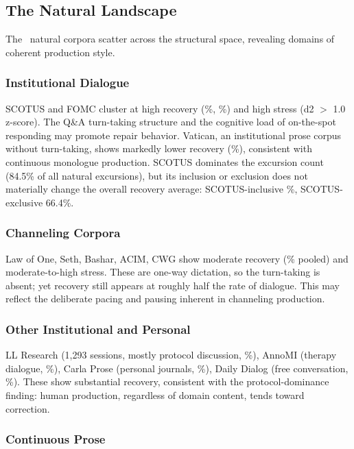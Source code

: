 \documentclass[11pt]{article}
\begin{document}
\subsection{The Natural Landscape}

The \nNatural\ natural corpora scatter across the structural space, revealing domains of coherent production style.

\subsubsection{Institutional Dialogue}

SCOTUS and FOMC cluster at high recovery (\recSCOTUS\%, \recFOMC\%) and high stress (d2 $>$ 1.0 z-score). The Q\&A turn-taking structure and the cognitive load of on-the-spot responding may promote repair behavior. Vatican, an institutional prose corpus without turn-taking, shows markedly lower recovery (\recVatican\%), consistent with continuous monologue production. SCOTUS dominates the excursion count (84.5\% of all natural excursions), but its inclusion or exclusion does not materially change the overall recovery average: SCOTUS-inclusive \recNatCorpusAvg\%, SCOTUS-exclusive 66.4\%.

\subsubsection{Channeling Corpora}

Law of One, Seth, Bashar, ACIM, CWG show moderate recovery (\recChannelingMean\% pooled) and moderate-to-high stress. These are one-way dictation, so the turn-taking is absent; yet recovery still appears at roughly half the rate of dialogue. This may reflect the deliberate pacing and pausing inherent in channeling production.

\subsubsection{Other Institutional and Personal}

LL Research (1,293 sessions, mostly protocol discussion, \recLLResearch\%), AnnoMI (therapy dialogue, \recAnnoMI\%), Carla Prose (personal journals, \recCarlaProse\%), Daily Dialog (free conversation, \recDailyDialog\%). These show substantial recovery, consistent with the protocol-dominance finding: human production, regardless of domain content, tends toward correction.

\subsubsection{Continuous Prose}
\end{document}
